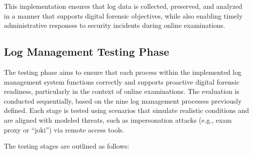 This implementation ensures that log data is collected, preserved, and analyzed in a manner that supports digital forensic objectives, while also enabling timely administrative responses to security incidents during online examinations.

\subsection{Log Management Testing Phase}

The testing phase aims to ensure that each process within the implemented log management system functions correctly and supports proactive digital forensic readiness, particularly in the context of online examinations. The evaluation is conducted sequentially, based on the nine log management processes previously defined. Each stage is tested using scenarios that simulate realistic conditions and are aligned with modeled threats, such as impersonation attacks (e.g., exam proxy or ``joki'') via remote access tools.

The testing stages are outlined as follows:

